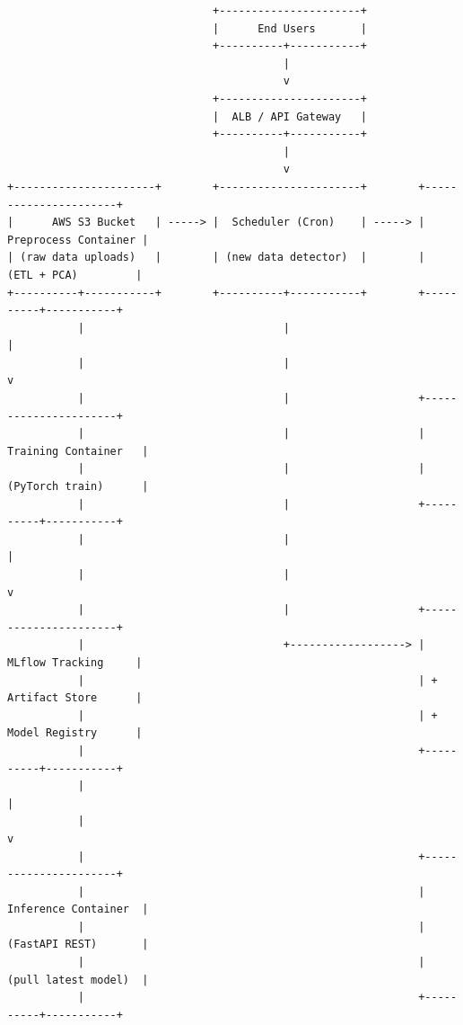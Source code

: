 \documentclass[10pt]{article}
\begin{document}
\begin{verbatim}
                                +----------------------+
                                |      End Users       |
                                +----------+-----------+
                                           |
                                           v
                                +----------------------+
                                |  ALB / API Gateway   |
                                +----------+-----------+
                                           |
                                           v
+----------------------+        +----------------------+        +----------------------+
|      AWS S3 Bucket   | -----> |  Scheduler (Cron)    | -----> | Preprocess Container |
| (raw data uploads)   |        | (new data detector)  |        |  (ETL + PCA)         |
+----------+-----------+        +----------+-----------+        +----------+-----------+
           |                               |                               |
           |                               |                               v
           |                               |                    +----------------------+
           |                               |                    | Training Container   |
           |                               |                    | (PyTorch train)      |
           |                               |                    +----------+-----------+
           |                               |                               |
           |                               |                               v
           |                               |                    +----------------------+
           |                               +------------------> |  MLflow Tracking     |
           |                                                    | + Artifact Store      |
           |                                                    | + Model Registry      |
           |                                                    +----------+-----------+
           |                                                               |
           |                                                               v
           |                                                    +----------------------+
           |                                                    | Inference Container  |
           |                                                    | (FastAPI REST)       |
           |                                                    | (pull latest model)  |
           |                                                    +----------+-----------+

\end{verbatim}
\end{document}
